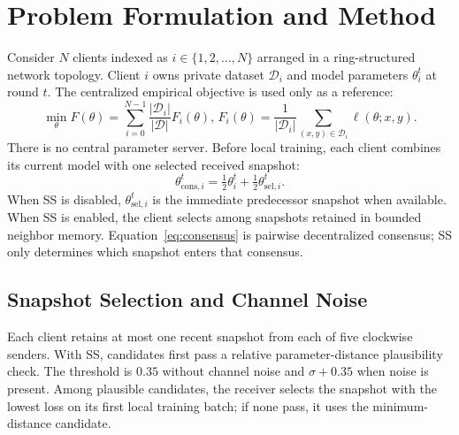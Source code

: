 \documentclass[conference]{IEEEtran}
\begin{document}

\section{Problem Formulation and Method}
Consider $N$ clients indexed as $i\in \{1, 2, \ldots, N\}$ arranged in a ring-structured network topology. Client $i$ owns private dataset $\mathcal{D}_i$ and model parameters $\theta_i^t$ at round $t$. The centralized empirical objective is used only as a reference:
\begin{equation}
\min_{\theta} F(\theta)=\sum_{i=0}^{N-1}\frac{|\mathcal{D}_i|}{|\mathcal{D}|}F_i(\theta),
\,
F_i(\theta)=\frac{1}{|\mathcal{D}_i|}\sum_{(x,y)\in\mathcal{D}_i}\ell(\theta;x,y).
\end{equation}
There is no central parameter server. Before local training, each client combines its current model with one selected received snapshot:
\begin{equation}
\theta_{\mathrm{cons},i}^t=\tfrac{1}{2}\theta_i^t+\tfrac{1}{2}\theta_{\mathrm{sel},i}^t.
\label{eq:consensus}
\end{equation}
When SS is disabled, $\theta_{\mathrm{sel},i}^t$ is the immediate predecessor snapshot when available. When SS is enabled, the client selects among snapshots retained in bounded neighbor memory. Equation~\eqref{eq:consensus} is pairwise decentralized consensus; SS only determines which snapshot enters that consensus.

\subsection{Snapshot Selection and Channel Noise}
Each client retains at most one recent snapshot from each of five clockwise senders. With SS, candidates first pass a relative parameter-distance plausibility check. The threshold is $0.35$ without channel noise and $\sigma+0.35$ when noise is present. Among plausible candidates, the receiver selects the snapshot with the lowest loss on its first local training batch; if none pass, it uses the minimum-distance candidate.
\end{document}

